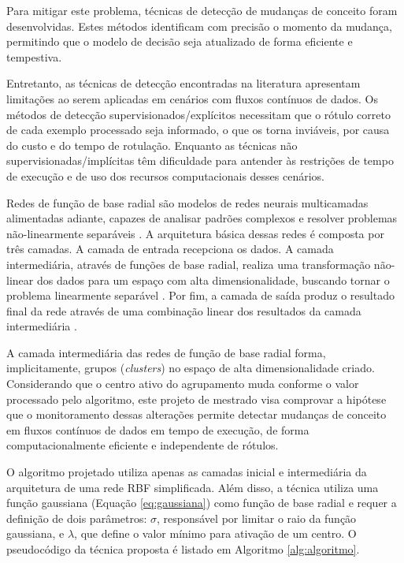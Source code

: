 \documentclass[qual, classic, a4paper]{ufbathesis}
\begin{document}
Para mitigar este problema, técnicas de detecção de mudanças de conceito foram desenvolvidas. 
Estes métodos identificam com precisão o momento da mudança, permitindo que o modelo de decisão seja atualizado de forma eficiente e tempestiva.

Entretanto, as técnicas de detecção encontradas na literatura apresentam limitações ao serem aplicadas em cenários com fluxos contínuos de dados.
Os métodos de detecção supervisionados/explícitos necessitam que o rótulo correto de cada exemplo processado seja informado, o que os torna inviáveis, por causa do custo e do tempo de rotulação.
Enquanto as técnicas não supervisionadas/implícitas têm dificuldade para antender às restrições de tempo de execução e de uso dos recursos computacionais desses cenários.

Redes de função de base radial são modelos de redes neurais multicamadas alimentadas adiante, capazes de analisar padrões complexos e resolver problemas não-linearmente separáveis \cite{Braga:RedesNeuraisTeoriaAplicacoes}.
A arquitetura básica dessas redes é composta por três camadas.
A camada de entrada recepciona os dados.
A camada intermediária, através de funções de base radial, realiza uma transformação não-linear dos dados para um espaço com alta dimensionalidade, buscando tornar o problema linearmente separável \cite{cover1965browse}.
Por fim, a camada de saída produz o resultado final da rede através de uma combinação linear dos resultados da camada intermediária \cite{Rojas:1996:NNS:235222}.

A camada intermediária das redes de função de base radial forma, implicitamente, grupos (\textit{clusters}) no espaço de alta dimensionalidade criado.
Considerando que o centro ativo do agrupamento muda conforme o valor processado pelo algoritmo, 
este projeto de mestrado visa comprovar a hipótese que o monitoramento dessas alterações permite detectar mudanças de conceito em fluxos contínuos de dados em tempo de execução, de forma computacionalmente eficiente e independente de rótulos.

O algoritmo projetado utiliza apenas as camadas inicial e intermediária da arquitetura de uma rede RBF simplificada.
Além disso, a técnica utiliza uma função gaussiana (Equação \ref{eq:gaussiana}) como função de base radial e requer a definição de dois parâmetros: 
\textit{$\sigma$}, responsável por limitar o raio da função gaussiana, e \textit{$\lambda$}, que define o valor mínimo para ativação de um centro.
O pseudocódigo da técnica proposta é listado em Algoritmo \ref{alg:algoritmo}.
\end{document}
